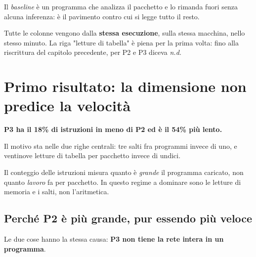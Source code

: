 \documentclass[11pt,a4paper,oneside]{report}
\begin{document}
Il \emph{baseline} è un programma che analizza il pacchetto e lo rimanda fuori
senza alcuna inferenza: è il pavimento contro cui si legge tutto il resto.

Tutte le colonne vengono dalla \textbf{stessa esecuzione}, sulla stessa
macchina, nello stesso minuto. La riga "letture di tabella" è piena per la prima
volta: fino alla riscrittura del capitolo precedente, per P2 e P3 diceva
\emph{n.d.}

\section{Primo risultato: la dimensione non predice la velocità}

\begin{lezione}
\textbf{P3 ha il 18\% di istruzioni in meno di P2 ed è il 54\% più lento.}

Il motivo sta nelle due righe centrali: tre salti fra programmi invece di uno, e
ventinove letture di tabella per pacchetto invece di undici.
\end{lezione}

Il conteggio delle istruzioni misura quanto è \emph{grande} il programma
caricato, non quanto \emph{lavoro} fa per pacchetto. In questo regime a dominare
sono le letture di memoria e i salti, non l'aritmetica.

\subsection*{Perché P2 è più grande, pur essendo più veloce}

Le due cose hanno la stessa causa: \textbf{P3 non tiene la rete intera in un
programma}.

\begin{center}
\end{center}
\end{document}
